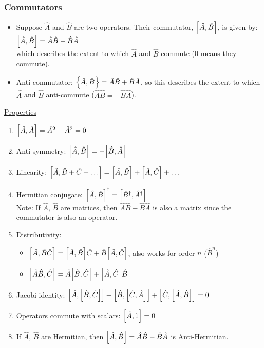 \documentclass[]{article}
\begin{document}
\subsubsection{Commutators}
\begin{itemize}
    \item Suppose $\hat{A}$ and $\hat{B}$ are two operators. Their commutator, $\comm{\hat{A}}{\hat{B}}$, is given by:\\
    $\comm{\hat{A}}{\hat{B}} = \hat{A}\hat{B}-\hat{B}\hat{A}$\\
    which describes the extent to which $\hat{A}$ and $\hat{B}$ commute (0 means they commute).
    \item Anti-commutator: $\acomm{\hat{A}}{\hat{B}} = \hat{A}\hat{B}+\hat{B}\hat{A}$, so this describes the extent to which $\hat{A}$ and $\hat{B}$ anti-commute ($\hat{A}\hat{B}=-\hat{B}\hat{A}$).
\end{itemize}

\underline{Properties}
\begin{enumerate}
    \item $\comm{\hat{A}}{\hat{A}} = \hat{A}^2 - \hat{A}^2 = 0$
    \item Anti-symmetry: $\comm{\hat{A}}{\hat{B}} = -\comm{\hat{B}}{\hat{A}}$
    \item Linearity: $\comm{\hat{A}}{\hat{B}+\hat{C}+\ldots} = \comm{\hat{A}}{\hat{B}}+\comm{\hat{A}}{\hat{C}}+\ldots$
    \item Hermitian conjugate: $\comm{\hat{A}}{\hat{B}}^{\dagger} = \comm{\hat{B}^{\dagger}}{\hat{A}^{\dagger}}$\\
    Note: If $\hat{A}$, $\hat{B}$ are matrices, then $\hat{A}\hat{B}-\hat{B}\hat{A}$ is also a matrix since the commutator is also an operator.
    \item Distributivity:
    \begin{itemize}
        \item $\comm{\hat{A}}{\hat{B}\hat{C}} = \comm{\hat{A}}{\hat{B}}\hat{C} + \hat{B}\comm{\hat{A}}{\hat{C}}$, also works for order $n$ ($\hat{B}^n$)
        \item $\comm{\hat{A}\hat{B}}{\hat{C}} = \hat{A}\comm{\hat{B}}{\hat{C}} + \comm{\hat{A}}{\hat{C}}\hat{B}$
    \end{itemize}
    \item Jacobi identity: $\comm{\hat{A}}{\comm{\hat{B}}{\hat{C}}} + \comm{\hat{B}}{\comm{\hat{C}}{\hat{A}}} + \comm{\hat{C}}{\comm{\hat{A}}{\hat{B}}} = 0$
    \item Operators commute with scalars: $\comm{\hat{A}}{1} = 0$
    \item If $\hat{A}$, $\hat{B}$ are \underline{Hermitian}, then $\comm{\hat{A}}{\hat{B}} = \hat{A}\hat{B}-\hat{B}\hat{A}$ is \underline{Anti-Hermitian}.
\end{enumerate}
\end{document}
